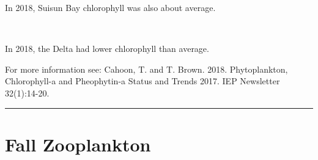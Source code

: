 \documentclass[
]{book}
\begin{document}
\begin{panel-grid}
\begin{columns-nocenter}
\begin{column40}
\end{column40}

\begin{column800}

In 2018, Suisun Bay chlorophyll was also about average.

\end{column800}

\begin{column40}

~

\end{column40}

\begin{column800}

In 2018, the Delta had lower chlorophyll than average.

\end{column800}

\end{columns-nocenter}

\end{panel-grid}

\begin{disclaimer}
For more information see: Cahoon, T. and T. Brown. 2018. Phytoplankton,
Chlorophyll-a and Pheophytin-a Status and Trends 2017. IEP Newsletter
32(1):14-20.
\end{disclaimer}

\begin{center}\rule{0.5\linewidth}{0.5pt}\end{center}

\hypertarget{fall-zooplankton}{%
\section{Fall Zooplankton}\label{fall-zooplankton}}
\end{document}
